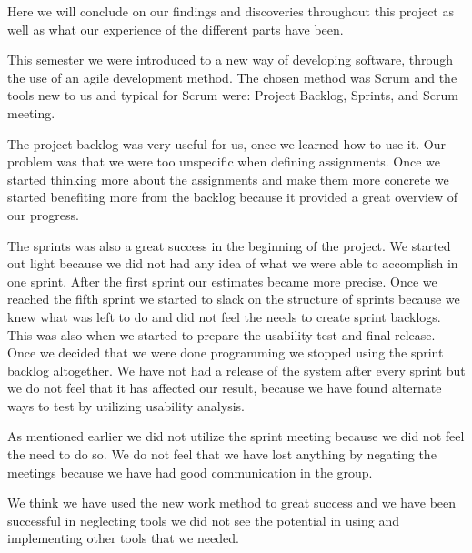 Here we will conclude on our findings and discoveries throughout this project as well as what our experience of the different parts have been.

This semester we were introduced to a new way of developing software, through the use of an agile development method. 
The chosen method was Scrum and the tools new to us and typical for Scrum were: Project Backlog, Sprints, and Scrum meeting.

The project backlog was very useful for us, once we learned how to use it. Our problem was that we were too unspecific when defining assignments. Once we started thinking more about the assignments and make them more concrete we started benefiting more from the backlog because it provided a great overview of our progress.

The sprints was also a great success in the beginning of the project. We started out light because we did not had any idea of what we were able to accomplish in one sprint. After the first sprint our estimates became more precise.
Once we reached the fifth sprint we started to slack on the structure of sprints because we knew what was left to do and did not feel the needs to create sprint backlogs. This was also when we started to prepare the usability test and final release.
Once we decided that we were done programming we stopped using the sprint backlog altogether. We have not had a release of the system after every sprint but we do not feel that it has affected our result, because we have found alternate ways to test by utilizing usability analysis.

As mentioned earlier we did not utilize the sprint meeting because we did not feel the need to do so. We do not feel that we have lost anything by negating the meetings because we have had good communication in the group.

We think we have used the new work method to great success and we have been successful in neglecting tools we did not see the potential in using and implementing other tools that we needed. 

